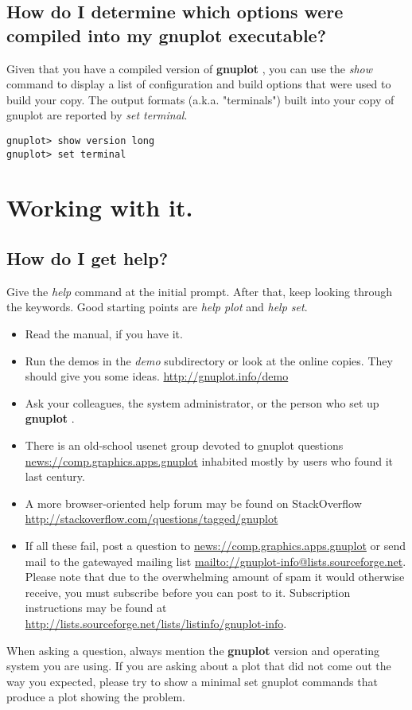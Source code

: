 \documentclass[a4paper,11pt]{article}
\def\http#1{{\small\href{http://#1}{\url{http://#1}}}}
\def\mailto#1{{\small\href{mailto://#1}{\url{mailto://#1}}}}
\def\news#1{\href{news://#1}{\url{news://#1}}}
\newcommand{\news}[1]%
            {\def~{\~{}}\htmladdnormallink{\latex{\url{#1}}\html{\textit{#1}}}%
                {news:#1}%
            }
\newcommand{\mailto}[1]%
            {\htmladdnormallink{\latex{\url{<#1>}}\html{\textit{#1}}}%
                {mailto:#1}%
            }
\newcommand{\http}[1]%
            {\htmladdnormallink{\latex{\url{http://#1}}%
                    \html{\textit{http://#1}}}%
                {http://#1}%
            }
\newcommand{\gnuplot}{\textbf{gnuplot }}
\begin{document}
\subsection{How do I determine which options were compiled into my \gnuplot executable?}

Given that you have a compiled version of \gnuplot, you can use the
{\em show} command to display a list of configuration and build options
that were used to build your copy.  The output formats (a.k.a. "terminals")
built into your copy of gnuplot are reported by {\em set terminal}.

\small
\begin{verbatim}
gnuplot> show version long
gnuplot> set terminal
\end{verbatim}
\normalsize


\section{Working with it.}

\subsection{How do I get help?}

Give the {\em help} command at the initial prompt. After that, keep
looking through the keywords. Good starting points are {\em help plot}
and {\em help set}.

\begin{itemize}
\item
Read the manual, if you have it.

\item
Run the demos in the {\em demo} subdirectory or look at the
online copies. They should give you some ideas.
\http{gnuplot.info/demo}

\item
Ask your colleagues, the system administrator, or the person who
set up \gnuplot.

\item
There is an old-school usenet group devoted to gnuplot questions
\news{comp.graphics.apps.gnuplot}
inhabited mostly by users who found it last century.

\item
A more browser-oriented help forum may be found on StackOverflow
\http{stackoverflow.com/questions/tagged/gnuplot}

\item
If all these fail, post a question to \news{comp.graphics.apps.gnuplot} or send mail
to the gatewayed mailing list \mailto{gnuplot-info@lists.sourceforge.net}.
Please note that due to the overwhelming amount of spam it would otherwise receive,
you must subscribe before you can post to it. Subscription instructions
may be found at
\http{lists.sourceforge.net/lists/listinfo/gnuplot-info}.

\end{itemize}
When asking a question, always mention the \gnuplot version and
operating system you are using.  If you are asking about a plot that
did not come out the way you expected, please try to show a minimal
set gnuplot commands that produce a plot showing the problem.
\end{document}
